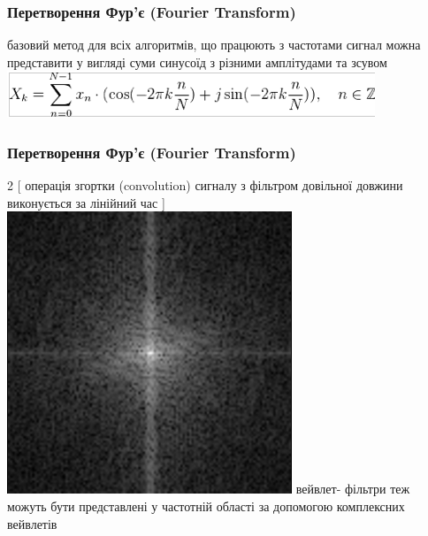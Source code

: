 \documentclass[12pt]{beamer}
\begin{document}
\begin{frame}\frametitle{Перетворення Фур'є (Fourier Transform)  }
базовий метод для всіх алгоритмів, що працюють з частотами \linebreak \linebreak  
сигнал можна представити у вигляді суми синусоїд з різними амплітудами та зсувом
\includegraphics[scale=0.5]{images/fourier_1d} 
\end{frame}

\begin{frame}\frametitle{Перетворення Фур'є (Fourier Transform)  }
	\begin{multicols}{2}
		[ операція згортки (convolution) сигналу з фільтром довільної довжини виконується за лінійний час
		]
		\includegraphics[scale=0.35]{images/image_fourier} 
		\columnbreak
		\linebreak
		вейвлет- фільтри теж можуть бути представлені у частотній області за допомогою комплексних вейвлетів
	\end{multicols}	
\end{frame}
\end{document}
